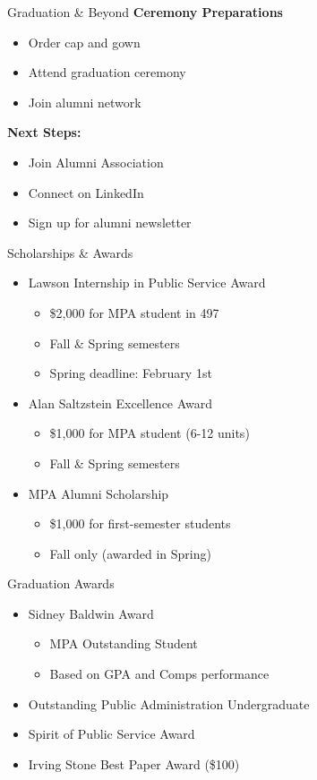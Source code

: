 \documentclass[10pt]{beamer}
\begin{document}
    \begin{frame}{Graduation \& Beyond}
    \textbf{Ceremony Preparations}
    \begin{itemize}
    \item Order cap and gown
    \item Attend graduation ceremony
    \item Join alumni network
    \end{itemize}
    
    \textbf{Next Steps:}
    \begin{itemize}
    \item Join Alumni Association
    \item Connect on LinkedIn
    \item Sign up for alumni newsletter
    \end{itemize}
    \end{frame}

\begin{frame}{Scholarships \& Awards}
\begin{itemize}
\item Lawson Internship in Public Service Award
    \begin{itemize}
    \item \$2,000 for MPA student in 497
    \item Fall \& Spring semesters
    \item Spring deadline: February 1st
    \end{itemize}
\item Alan Saltzstein Excellence Award
    \begin{itemize}
    \item \$1,000 for MPA student (6-12 units)
    \item Fall \& Spring semesters
    \end{itemize}
\item MPA Alumni Scholarship
    \begin{itemize}
    \item \$1,000 for first-semester students
    \item Fall only (awarded in Spring)
    \end{itemize}
\end{itemize}
\end{frame}

\begin{frame}{Graduation Awards}
\begin{itemize}
\item Sidney Baldwin Award
    \begin{itemize}
    \item MPA Outstanding Student
    \item Based on GPA and Comps performance
    \end{itemize}
\item Outstanding Public Administration Undergraduate
\item Spirit of Public Service Award
\item Irving Stone Best Paper Award (\$100)
\end{itemize}
\end{frame}
\end{document}
